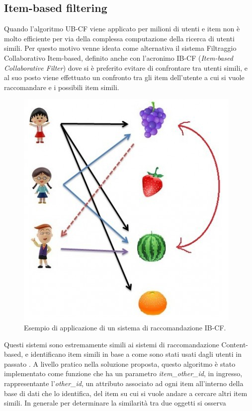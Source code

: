 \subsection{Item-based filtering}
Quando l'algoritmo UB-CF viene applicato per milioni di utenti e item non è molto efficiente per via della complessa computazione della 
ricerca di utenti simili. Per questo motivo venne ideata come alternativa il sistema Filtraggio Collaborativo Item-based, 
definito anche con l'acronimo IB-CF (\textit{Item-based Collaborative Filter}) dove si è preferito evitare di confrontare tra utenti 
simili, e al suo posto viene effettuato un confronto tra gli item dell'utente a cui si vuole raccomandare e i possibili item simili.
%
\begin{figure}[ht!]
    \centering
    \includegraphics[scale=0.5]{images/IB_CF_ex.png}
    \caption{Esempio di applicazione di un sistema di raccomandazione IB-CF.}
    \label{fig:IB_CF}
\end{figure}
\hfill\break
Questi sistemi sono estremamente simili ai sistemi di raccomandazione Content-based, e identificano item simili in base a come sono 
stati usati dagli utenti in passato \cite{item-based-collaborative-filtering}.\hfill\break
A livello pratico nella soluzione proposta, questo algoritmo è stato implementato come funzione che ha un 
parametro \textit{item\_other\_id}, in ingresso, rappresentante l'\textit{other\_id}, un attributo associato ad ogni item all'interno della base di dati 
che lo identifica, del item su cui si vuole andare a cercare altri item simili. In generale per determinare la similarità tra due oggetti si osserva 
